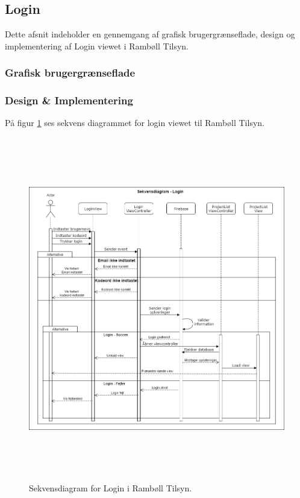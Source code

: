 \subsection{Login}
Dette afsnit indeholder en gennemgang af grafisk brugergrænseflade, design og implementering af Login viewet i Rambøll Tilsyn.
\subsubsection{Grafisk brugergrænseflade}

\subsubsection{Design \& Implementering}
På figur \ref{fig:LoginSekvens} ses sekvens diagrammet for login viewet til Rambøll Tilsyn.
\begin{figure}[H] %
	\centering
	\includegraphics[height=15cm, width=15cm]{../ArkitekturDesign/Design/Login/LoginSekvensDiagram}
	\caption{Sekvensdiagram for Login i Rambøll Tilsyn.}
	\label{fig:LoginSekvens}
\end{figure}

\clearpage